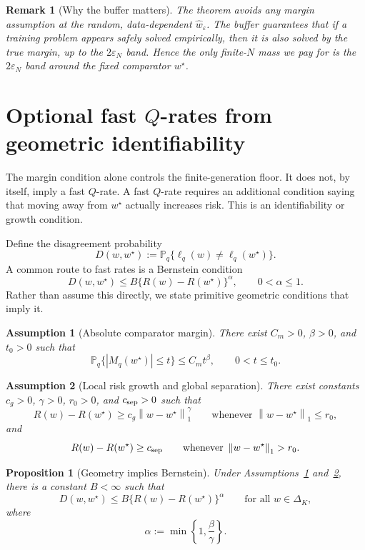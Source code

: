 \documentclass[11pt]{article}
\newtheorem{proposition}{Proposition}
\newtheorem{assumption}{Assumption}
\newtheorem{remark}{Remark}
\newcommand{\Pp}{\mathbb P}
\newcommand{\what}{\widehat w}
\newcommand{\wstar}{w^\star}
\newcommand{\eps}{\varepsilon}
\newcommand{\norm}[1]{\left\lVert #1\right\rVert}
\begin{document}
\begin{remark}[Why the buffer matters]
The theorem avoids any margin assumption at the random, data-dependent $\what_\eps$.  The buffer guarantees that if a training problem appears safely solved empirically, then it is also solved by the true margin, up to the $2\eps_N$ band.  Hence the only finite-$N$ mass we pay for is the $2\eps_N$ band around the fixed comparator $\wstar$.
\end{remark}

\section{Optional fast $Q$-rates from geometric identifiability}

The margin condition alone controls the finite-generation floor.  It does not, by itself, imply a fast $Q$-rate.  A fast $Q$-rate requires an additional condition saying that moving away from $\wstar$ actually increases risk.  This is an identifiability or growth condition.

Define the disagreement probability
\[
D(w,\wstar)
:=
\Pp_q\{\ell_q(w)\ne \ell_q(\wstar)\}.
\]
A common route to fast rates is a Bernstein condition
\[
D(w,\wstar)
\le
B\{R(w)-R(\wstar)\}^{\alpha},
\qquad 0<\alpha\le 1.
\]
Rather than assume this directly, we state primitive geometric conditions that imply it.

\begin{assumption}[Absolute comparator margin]
\label{ass:absolute-margin}
There exist $C_m>0$, $\beta>0$, and $t_0>0$ such that
\[
\Pp_q\{|M_q(\wstar)|\le t\}
\le
C_m t^\beta,
\qquad 0<t\le t_0.
\]
\end{assumption}

\begin{assumption}[Local risk growth and global separation]
\label{ass:growth}
There exist constants $c_g>0$, $\gamma>0$, $r_0>0$, and $c_{\rm sep}>0$ such that
\[
R(w)-R(\wstar)
\ge
c_g\norm{w-\wstar}_1^\gamma
\qquad
\text{whenever }\norm{w-\wstar}_1\le r_0,
\]
and
\[
R(w)-R(\wstar)
\ge c_{\rm sep}
\qquad
\text{whenever }\norm{w-\wstar}_1>r_0.
\]
\end{assumption}

\begin{proposition}[Geometry implies Bernstein]
\label{prop:geom-bernstein}
Under Assumptions~\ref{ass:absolute-margin} and~\ref{ass:growth}, there is a constant $B<\infty$ such that
\[
D(w,\wstar)
\le
B\{R(w)-R(\wstar)\}^{\alpha}
\qquad
\text{for all }w\in\Delta_K,
\]
where
\[
\alpha:=\min\left\{1,\frac{\beta}{\gamma}\right\}.
\]
\end{proposition}
\end{document}
